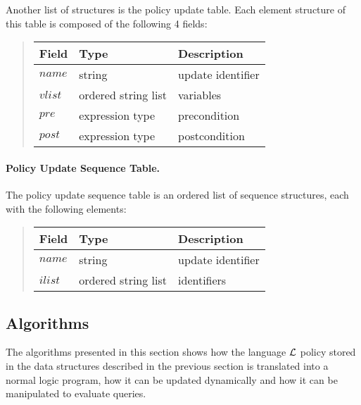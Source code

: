 \documentclass[10pt, twocolumn]{article}
\begin{document}
            Another list of structures is the policy update table. Each element
            structure of this table is composed of the following 4 fields:

            \begin{quote}
              \begin{tabular}[t]{|l|l|l|}
                \hline
                \textbf{Field} & \textbf{Type} & \textbf{Description} \\
                \hline
                $name$ & string & update identifier \\
                \hline
                $vlist$ & ordered string list & variables \\
                \hline
                $pre$ & expression type & precondition \\
                \hline
                $post$ & expression type & postcondition \\
                \hline
              \end{tabular}
            \end{quote}

        \paragraph{Policy Update Sequence Table.}

          The policy update sequence table is an ordered list of sequence
          structures, each with the following elements:

          \begin{quote}
            \begin{tabular}[t]{|l|l|l|}
              \hline
              \textbf{Field} & \textbf{Type} & \textbf{Description} \\
              \hline
              $name$ & string & update identifier \\
              \hline
              $ilist$ & ordered string list & identifiers \\
              \hline
            \end{tabular}
          \end{quote}

    \subsection{Algorithms}

      The algorithms presented in this section shows how the language
      ${\cal L}$ policy stored in the data structures described in the previous
      section is translated into a normal logic program, how it can be updated
      dynamically and how it can be manipulated to evaluate queries.
\end{document}
